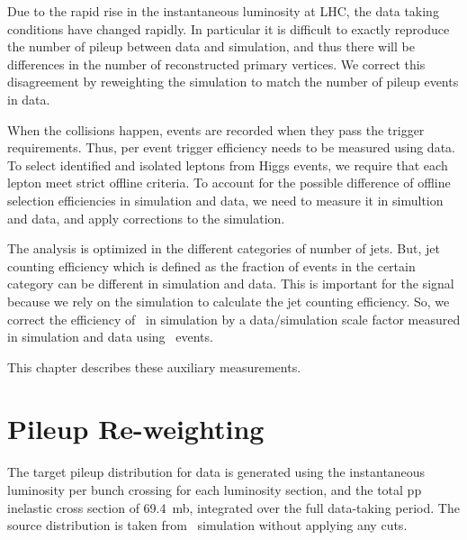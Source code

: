 
Due to the rapid rise in the instantaneous luminosity at LHC, 
the data taking conditions have changed rapidly. 
In particular it is difficult to exactly reproduce the number of pileup 
between data and simulation, and thus there will be differences in the 
number of reconstructed primary vertices. 
We correct this disagreement by reweighting the simulation 
to match the number of pileup events in data.

When the collisions happen, 
events are recorded when they pass the trigger requirements. 
Thus, per event trigger efficiency needs to be measured using data. 
To select identified and isolated leptons from Higgs events, we require 
that each lepton meet strict offline criteria. To account for the possible difference
of offline selection efficiencies in simulation and data, we need to measure it 
in simultion and data, and apply corrections to the simulation. 

The analysis is optimized in the different categories of number of jets. 
But, jet counting efficiency which is defined as the fraction 
of events in the certain category
can be different in simulation and data.  
This is important for the signal because we rely on the simulation 
to calculate the jet counting efficiency. 
So, we correct the efficiency of \hww\ in simulation by a data/simulation scale 
factor measured in simulation and data using \dyll~events.  

This chapter describes these auxiliary measurements. 

\section{Pileup Re-weighting}

The target pileup distribution for data is generated using the instantaneous luminosity 
per bunch crossing for each luminosity section, and the total pp inelastic cross section 
of 69.4~mb, integrated over the full data-taking period. The source distribution is taken 
from \dyll\ simulation without applying any cuts. 

